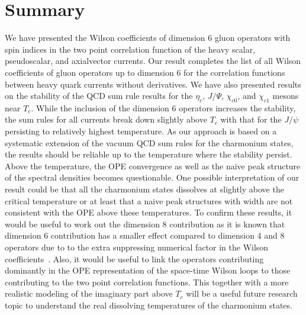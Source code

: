 \documentclass[aps,prc,superscriptaddress,showpacs,floatfix, nofootinbib,preprintnumbers,twocolumn]{revtex4}
\begin{document}
\section{Summary}

 We have presented the Wilson coefficients of dimension 6 gluon operators with spin indices in the two point correlation function of the heavy scalar, pseudoscalar, and axialvector currents. Our result completes the list of all Wilson coefficients of gluon operators up to dimension 6 for the correlation functions between heavy quark currents without derivatives. 
We have also presented results on  the stability of the QCD sum rule results  for the  $\eta_c$, $J/\Psi$, $\chi_{c0}$, and $\chi_{c1}$ mesons near $T_c$.
While the inclusion of the dimension 6 operators increases the stability, the sum rules for all currents break down slightly above $T_c$  with that for the $J/\psi$ persisting to relatively highest temperature.   As our approach is  based on a systematic extension of the vacuum QCD sum rules for the charmonium states, the results should be reliable up to the temperature where  the stability persist.  Above the temperature, the OPE convergence as well as the naive peak structure of the spectral densities becomes questionable.  
One possible interpretation of our result could be that all the charmonium states dissolves at slightly above the critical temperature or at least that  a naive peak structures with width are not consistent with the OPE above these temperatures.  To confirm these results, it would be useful to work out the dimension 8 contribution as it is known that dimension 6 contribution has a smaller effect compared to dimension 4 and 8 operators due to to the extra suppressing numerical factor in the Wilson coefficients~\cite{Nikolaev:1982rq}. Also, it would be useful to link the operators contributing dominantly in the OPE representation of the space-time Wilson loops to those contributing to the two point correlation functions.  This together with a more realistic modeling of the imaginary part above $T_c$ will be a useful future research topic to understand the real dissolving temperatures of the charmonium states.  
\end{document}

